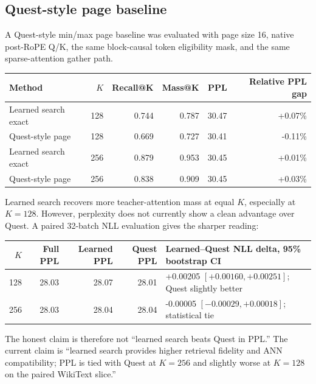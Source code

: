 \documentclass[10pt]{article}
\begin{document}
\subsection{Quest-style page baseline}
A Quest-style min/max page baseline was evaluated with page size 16, native
post-RoPE Q/K, the same block-causal token eligibility mask, and the same
sparse-attention gather path.
\begin{table}[h]
\centering
\begin{tabular}{lrrrrr}
\toprule
Method & $K$ & Recall@K & Mass@K & PPL & Relative PPL gap\\
\midrule
Learned search exact & 128 & 0.744 & 0.787 & 30.47 & +0.07\%\\
Quest-style page & 128 & 0.669 & 0.727 & 30.41 & -0.11\%\\
Learned search exact & 256 & 0.879 & 0.953 & 30.45 & +0.01\%\\
Quest-style page & 256 & 0.838 & 0.909 & 30.45 & +0.03\%\\
\bottomrule
\end{tabular}
\end{table}
Learned search recovers more teacher-attention mass at equal $K$, especially at
$K=128$. However, perplexity does not currently show a clean advantage over
Quest. A paired 32-batch NLL evaluation gives the sharper reading:
\begin{table}[h]
\centering
\begin{tabular}{rrrrl}
\toprule
$K$ & Full PPL & Learned PPL & Quest PPL & Learned--Quest NLL delta, 95\% bootstrap CI\\
\midrule
128 & 28.03 & 28.07 & 28.01 & +0.00205 $[+0.00160,+0.00251]$; Quest slightly better\\
256 & 28.03 & 28.04 & 28.04 & -0.00005 $[-0.00029,+0.00018]$; statistical tie\\
\bottomrule
\end{tabular}
\end{table}
The honest claim is therefore not ``learned search beats Quest in PPL.'' The
current claim is ``learned search provides higher retrieval fidelity and ANN
compatibility; PPL is tied with Quest at $K=256$ and slightly worse at $K=128$
on the paired WikiText slice.''
\end{document}
